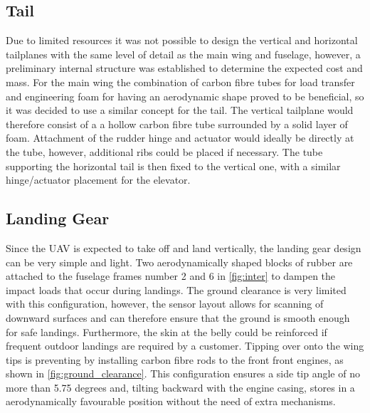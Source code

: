 \subsection{Tail}

Due to limited resources it was not possible to design the vertical and horizontal tailplanes with the same level of detail as the main wing and fuselage, however, a preliminary internal structure was established to determine the expected cost and mass. For the main wing the combination of carbon fibre tubes for load transfer and engineering foam for having an aerodynamic shape proved to be beneficial, so it was decided to use a similar concept for the tail. The vertical tailplane would therefore consist of a a hollow carbon fibre tube surrounded by a solid layer of foam. Attachment of the rudder hinge and actuator would ideally be directly at the tube, however, additional ribs could be placed if necessary. The tube supporting the horizontal tail is then fixed to the vertical one, with a similar hinge/actuator placement for the elevator.  


\subsection{Landing Gear}

Since the UAV is expected to take off and land vertically, the landing gear design can be very simple and light. Two aerodynamically shaped blocks of rubber are attached to the fuselage frames number 2 and 6 in \autoref{fig:inter} to dampen the impact loads that occur during landings. The ground clearance is very limited with this configuration, however, the sensor layout allows for scanning of downward surfaces and can therefore ensure that the ground is smooth enough for safe landings. Furthermore, the skin at the belly could be reinforced if frequent outdoor landings are required by a customer.   
Tipping over onto the wing tips is preventing by installing carbon fibre rods to the front front engines, as shown in \autoref{fig:ground_clearance}. This configuration ensures a side tip angle of no more than 5.75 degrees and, tilting backward with the engine casing, stores in a aerodynamically favourable position without the need of extra mechanisms.


